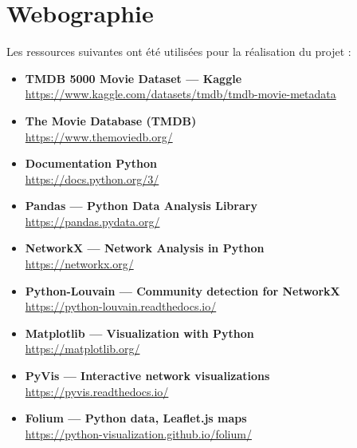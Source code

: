 \documentclass[11pt,a4paper,oneside,openany]{report}
\begin{document}
\chapter{Webographie}

Les ressources suivantes ont été utilisées pour la réalisation du projet :

\begin{itemize}
    
    \item \textbf{TMDB 5000 Movie Dataset — Kaggle} \\
    \url{https://www.kaggle.com/datasets/tmdb/tmdb-movie-metadata}

    \item \textbf{The Movie Database (TMDB)} \\
    \url{https://www.themoviedb.org/}

    \item \textbf{Documentation Python} \\
    \url{https://docs.python.org/3/}

    \item \textbf{Pandas — Python Data Analysis Library} \\
    \url{https://pandas.pydata.org/}

    \item \textbf{NetworkX — Network Analysis in Python} \\
    \url{https://networkx.org/}

    \item \textbf{Python-Louvain — Community detection for NetworkX} \\
    \url{https://python-louvain.readthedocs.io/}

    \item \textbf{Matplotlib — Visualization with Python} \\
    \url{https://matplotlib.org/}

    \item \textbf{PyVis — Interactive network visualizations} \\
    \url{https://pyvis.readthedocs.io/}

    \item \textbf{Folium — Python data, Leaflet.js maps} \\
    \url{https://python-visualization.github.io/folium/}

\end{itemize}

\appendix
\end{document}
